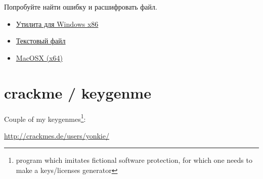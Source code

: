 Попробуйте найти ошибку и расшифровать файл.

\begin{itemize}
\item
\href{http://yurichev.com/RE-exercises/middle/4/amateur_cryptor.exe}{Утилита для Windows x86}

\item
\href{http://yurichev.com/RE-exercises/middle/4/text_encrypted}{Текстовый файл}

\item
\href{http://yurichev.com/RE-exercises/middle/3/unknown_utility_2_3_MacOSX.tar}{MacOSX (x64)}
\end{itemize}

\section{crackme / keygenme}

{Couple of my keygenmes\footnote{program which imitates fictional software protection, 
for which one needs to make a keys/licenses generator}:}

\url{http://crackmes.de/users/yonkie/}

